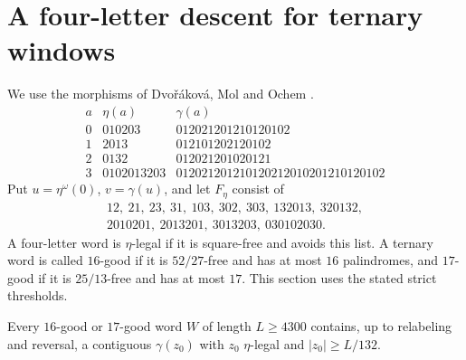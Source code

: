 \section{A four-letter descent for ternary windows}
\label{sec:ternary-descent}

We use the morphisms of Dvo\v r\'akov\'a, Mol and Ochem \cite[Section~6]{DMO}.
\[
\begin{array}{c|l|l}
a&\eta(a)&\gamma(a)\\\hline
0&010203&012021201210120102\\
1&2013&012101202120102\\
2&0132&012021201020121\\
3&0102013203&012021201210120212010201210120102
\end{array}
\]
Put \(u=\eta^\omega(0)\), \(v=\gamma(u)\), and let \(F_\eta\) consist of
\[
\begin{gathered}
 12,\ 21,\ 23,\ 31,\ 103,\ 302,\ 303,\ 132013,\ 320132,\\
 2010201,\ 2013201,\ 3013203,\ 030102030.
\end{gathered}
\]
A four-letter word is \(\eta\)-legal if it is square-free and avoids this list. A ternary word is called \(16\)-good if it is \(52/27\)-free and has at most \(16\) palindromes, and \(17\)-good if it is \(25/13\)-free and has at most \(17\). This section uses the stated strict thresholds.

\begin{lemma}\label{lem:first-gamma}
Every \(16\)-good or \(17\)-good word \(W\) of length \(L\ge4300\) contains, up to relabeling and reversal, a contiguous \(\gamma(z_0)\) with \(z_0\) \(\eta\)-legal and \(|z_0|\ge L/132\).
\end{lemma}

